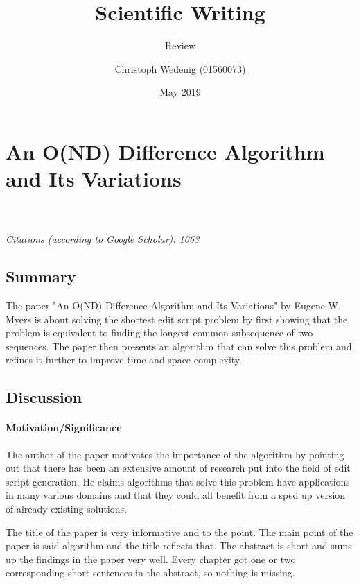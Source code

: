 \documentclass{scrartcl}
\title{Scientific Writing}
\subtitle{Review}
\author{Christoph Wedenig (01560073)}
\date{May 2019}
\begin{document}
\maketitle

\section{An O(ND) Difference Algorithm and Its Variations}
\\\\
\emph{Citations (according to Google Scholar): 1063}

\subsection{Summary}
The paper "An O(ND) Difference Algorithm and Its Variations" by Eugene W. Myers is about solving the shortest edit script problem by first showing that the problem is equivalent to finding the longest common subsequence of two sequences. The paper then presents an algorithm that can solve this problem and refines it further to improve time and space complexity.

\subsection{Discussion}
\paragraph{Motivation/Significance}{
The author of the paper motivates the importance of the algorithm by pointing out that there has been an extensive amount of research put into the field of edit script generation. He claims algorithms that solve this problem have applications in many various domains and that they could all benefit from a sped up version of already existing solutions.
}

The title of the paper is very informative and to the point. The main point of the paper is said algorithm and the title reflects that.
The abstract is short and sums up the findings in the paper very well. Every chapter got one or two corresponding short sentences in the abstract, so nothing is missing.
\end{document}
